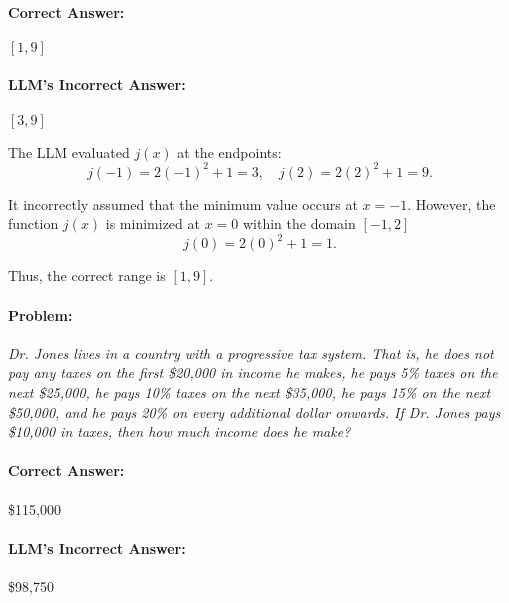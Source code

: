 \documentclass[11pt,a4paper]{article}
\begin{document}
\paragraph{Correct Answer:} \( [1, 9] \)

\paragraph{LLM's Incorrect Answer:} \( [3, 9] \)

\begin{tcolorbox}[colback=gray!10, colframe=black, title=\textbf{Step-by-Step Analysis}, fonttitle=\bfseries]
\footnotesize
The LLM evaluated \( j(x) \) at the endpoints:
\[
j(-1) = 2(-1)^2 + 1 = 3, \quad j(2) = 2(2)^2 + 1 = 9.
\]

It incorrectly assumed that the minimum value occurs at \( x = -1 \). However, the function \( j(x) \) is minimized at \( x = 0 \) within the domain \( [-1, 2] \)
\[
j(0) = 2(0)^2 + 1 = 1.
\]

Thus, the correct range is \( [1, 9] \).
\end{tcolorbox}

\paragraph{Problem:} \textit{Dr. Jones lives in a country with a progressive tax system. That is, he does not pay any taxes on the first \$20,000 in income he makes, he pays 5\% taxes on the next \$25,000, he pays 10\% taxes on the next \$35,000, he pays 15\% on the next \$50,000, and he pays 20\% on every additional dollar onwards. If Dr. Jones pays \$10,000 in taxes, then how much income does he make?}

\paragraph{Correct Answer:} \$115,000

\paragraph{LLM's Incorrect Answer:} \$98,750
\end{document}
